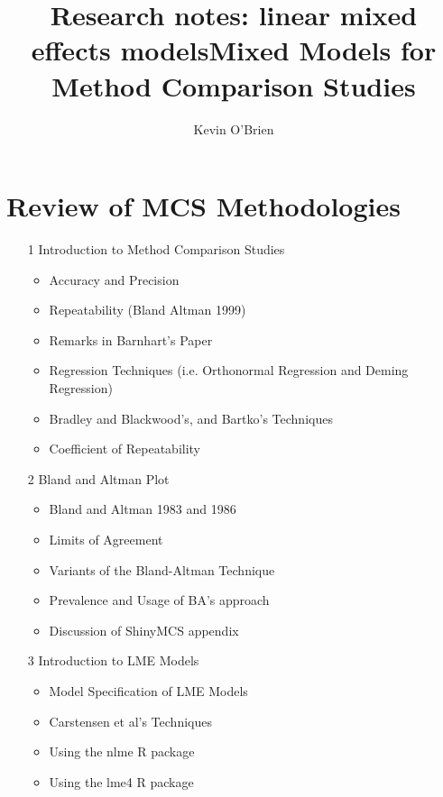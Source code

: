 \documentclass[12pt, a4paper]{report}
\title{Research notes: linear mixed effects models}
\author{ } \date{ }
\theoremstyle{plain}
\theoremstyle{definition}
\theoremstyle{remark}
\begin{document}
	\author{Kevin O'Brien}
	\title{Mixed Models for Method Comparison Studies}
	\tableofcontents

	\chapter{Review of MCS Methodologies}
\begin{itemize}		
	
	\item[1]	Introduction to Method Comparison Studies	
	\begin{itemize}	
		\item	Accuracy and Precision
		\item	Repeatability (Bland Altman 1999)
		\item	Remarks in Barnhart's Paper
		\item	Regression Techniques (i.e. Orthonormal Regression and Deming Regression)
		\item   Bradley and Blackwood's, and Bartko's Techniques
		\item   Coefficient of Repeatability
	\end{itemize}	
	
	
	\item[2]	Bland and Altman Plot	
	\begin{itemize}	
		\item	Bland and Altman 1983 and 1986
		\item	Limits of Agreement
		\item	Variants of the Bland-Altman Technique
		\item   Prevalence and Usage of BA's approach
		\item   Discussion of ShinyMCS appendix
	\end{itemize}
	
	\item[3]	Introduction to LME Models	
	\begin{itemize}	
		\item	Model Specification of LME Models
		\item	Carstensen et al's Techniques
		\item	Using the nlme R package
		\item   Using the lme4 R package
	\end{itemize}
	

\end{itemize}
\end{document}
